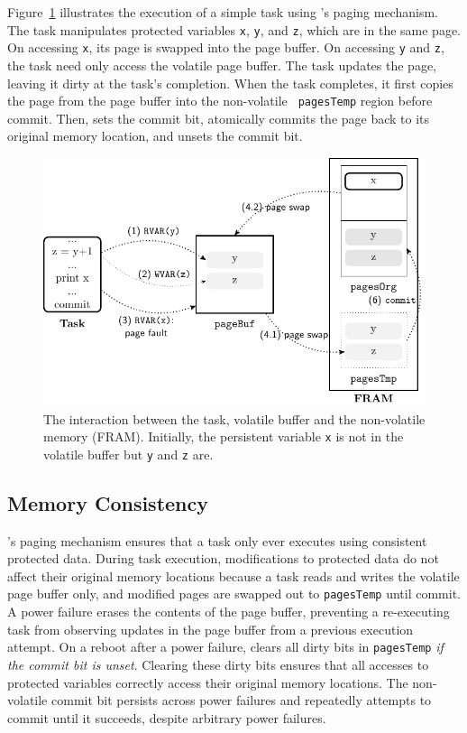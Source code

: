 Figure~\ref{fig:volatile-buffer} illustrates the execution of a simple task using \sys's paging mechanism. The task manipulates protected variables {\tt x}, {\tt y}, and {\tt z}, which are in the same page. On accessing {\tt x}, its page is swapped into the page buffer. On accessing {\tt y} and {\tt z}, the task need only access the volatile page buffer. The task updates the page, leaving it dirty at the task's completion. When the task completes, it first copies the page from the page buffer into the non-volatile {\tt
pagesTemp} region before commit. Then, \sys sets the commit bit, atomically commits the page back to its original memory location, and unsets the commit bit.

\begin{figure}[t]
	\centering
	\includegraphics[width=\columnwidth]{figures/sram-buffer}
	\caption{The interaction between the task, volatile buffer and the non-volatile memory (FRAM). Initially, the persistent variable \texttt{x} is not in the volatile buffer but \texttt{y} and \texttt{z} are.}
	\label{fig:volatile-buffer}
\end{figure}

\subsection{Memory Consistency}

\sys's paging mechanism ensures that a task only ever executes using consistent protected data. During task execution, modifications to protected data do not affect their original memory locations because a task reads and writes the volatile page buffer only, and modified pages are swapped out to \texttt{pagesTemp} until commit. A power failure erases the contents of the page buffer, preventing a re-executing task from observing updates in the page buffer from a previous execution attempt. On a reboot after a power failure,
\sys clears all dirty bits in {\tt pagesTemp} {\em if the commit bit is unset}. Clearing these dirty bits ensures that all accesses to protected variables correctly access their original memory locations. The non-volatile commit bit persists across power failures and \sys repeatedly attempts to commit until it succeeds, despite arbitrary power failures.

